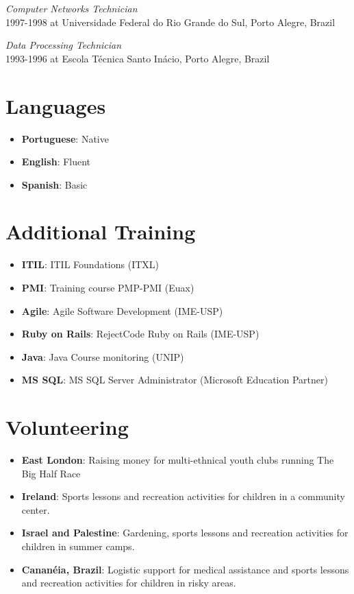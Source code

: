 \documentclass[margin]{res}
\begin{document}
\begin{resume}
      \textit{Computer Networks Technician} \\ 
            1997-1998 at Universidade Federal do Rio Grande do Sul, Porto Alegre, Brazil
      
      \textit{Data Processing Technician} \\
            1993-1996 at Escola Técnica Santo Inácio, Porto Alegre, Brazil
  
\section{Languages} 
  \begin{itemize}
    \vspace{2mm}
      \item \textbf{Portuguese}: Native
      \item \textbf{English}: Fluent
      \item \textbf{Spanish}: Basic
  \end{itemize}      

\section{Additional Training}
  \begin{itemize}
    \vspace{2mm}
      \item \textbf{ITIL}: ITIL Foundations (ITXL)
      \item \textbf{PMI}: Training course PMP-PMI (Euax)
      \item \textbf{Agile}: Agile Software Development (IME-USP)
      \item \textbf{Ruby on Rails}: RejectCode Ruby on Rails (IME-USP)
      \item \textbf{Java}: Java Course monitoring (UNIP)
      \item \textbf{MS SQL}: MS SQL Server Administrator (Microsoft Education Partner)
  \end{itemize}      
  
\section{Volunteering}
	\begin{itemize}
    \vspace{2mm}
      \item \textbf{East London}: Raising money for multi-ethnical youth clubs running The Big Half Race
		  \item \textbf{Ireland}: Sports lessons and recreation activities for children in a community center.\vspace{1mm}
		  \item \textbf{Israel and Palestine}: Gardening, sports lessons and recreation activities for children in summer camps.\vspace{1mm}
		  \item \textbf{Cananéia, Brazil}: Logistic support for medical assistance and sports lessons and recreation activities for children in risky areas.
	\end{itemize}

\end{resume} 
\end{document}
